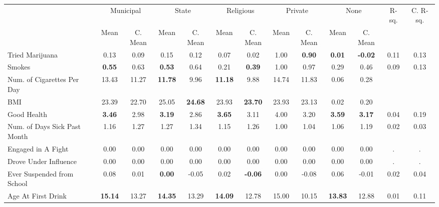 \begin{tabular}{l c c c c c c c c c c c c}
\toprule
& \multicolumn{2}{c}{Municipal} & \multicolumn{2}{c}{State} & \multicolumn{2}{c}{Religious} & \multicolumn{2}{c}{Private} & \multicolumn{2}{c}{None} & R-sq. & C. R-sq. \\
& \scriptsize Mean & \scriptsize C. Mean & \scriptsize Mean & \scriptsize C. Mean & \scriptsize Mean & \scriptsize C. Mean & \scriptsize Mean & \scriptsize C. Mean & \scriptsize Mean & \scriptsize C. Mean & & \\
\midrule
Tried Marijuana &      0.13 & 0.09 &      0.15 & 0.12 &      0.07 & 0.02 &      1.00 & \textbf{     0.90} & \textbf{     0.01} & \textbf{    -0.02} &      0.11 &      0.13 \\
Smokes & \textbf{     0.55} & 0.63 & \textbf{     0.53} & 0.64 &      0.21 & \textbf{     0.39} &      1.00 & 0.97 &      0.29 & 0.46 &      0.09 &      0.13 \\
Num. of Cigarettes Per Day &     13.43 & 11.27 & \textbf{    11.78} & 9.96 & \textbf{    11.18} & 9.88 &     14.74 & 11.83 &      0.06 &      0.28 \\
BMI &     23.39 & 22.70 &     25.05 & \textbf{    24.68} &     23.93 & \textbf{    23.70} &     23.93 & 23.13 &      0.02 &      0.20 \\
Good Health & \textbf{     3.46} & 2.98 & \textbf{     3.19} & 2.86 & \textbf{     3.65} & 3.11 &      4.00 & 3.20 & \textbf{     3.59} & \textbf{     3.17} &      0.04 &      0.19 \\
Num. of Days Sick Past Month &      1.16 & 1.27 &      1.27 & 1.34 &      1.15 & 1.26 &      1.00 & 1.04 &      1.06 & 1.19 &      0.02 &      0.03 \\
Engaged in A Fight &      0.00 & 0.00 &      0.00 & 0.00 &      0.00 & 0.00 &      0.00 & 0.00 &      0.00 & 0.00 &         . &         . \\
Drove Under Influence &      0.00 & 0.00 &      0.00 & 0.00 &      0.00 & 0.00 &      0.00 & 0.00 &      0.00 & 0.00 &         . &         . \\
Ever Suspended from School &      0.08 & 0.01 & \textbf{     0.00} & -0.05 &      0.02 & \textbf{    -0.06} &      0.00 & -0.08 &      0.06 & -0.01 &      0.02 &      0.04 \\
Age At First Drink & \textbf{    15.14} & 13.27 & \textbf{    14.35} & 13.29 & \textbf{    14.09} & 12.78 &     15.00 & 10.15 & \textbf{    13.83} & 12.88 &      0.01 &      0.11 \\
\bottomrule
\end{tabular}
